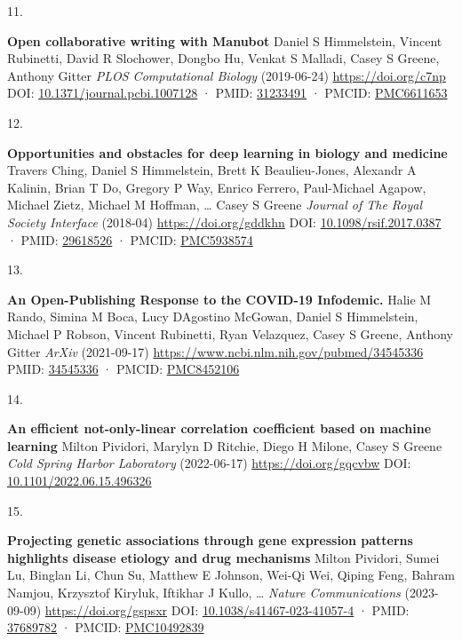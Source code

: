 \documentclass[
]{article}
\newlength{\cslhangindent}
\newlength{\csllabelwidth}
\newlength{\cslentryspacingunit} %
\newenvironment{CSLReferences}[2] %
 {%
  \setlength{\parindent}{0pt}
  \ifodd #1
  \let\oldpar\par
  \def\par{\hangindent=\cslhangindent\oldpar}
  \fi
  \setlength{\parskip}{#2\cslentryspacingunit}
 }%
 {}
\newcommand{\CSLBlock}[1]{#1\hfill\break}
\newcommand{\CSLLeftMargin}[1]{\parbox[t]{\csllabelwidth}{#1}}
\newcommand{\CSLRightInline}[1]{\parbox[t]{\linewidth - \csllabelwidth}{#1}\break}
\begin{document}
\begin{CSLReferences}{0}{0}
\leavevmode{}%
\CSLLeftMargin{11. }%
\CSLRightInline{\textbf{Open collaborative writing with Manubot}
\CSLBlock{Daniel S Himmelstein, Vincent Rubinetti, David R Slochower, Dongbo Hu, Venkat S Malladi, Casey S Greene, Anthony Gitter} \emph{PLOS Computational Biology} (2019-06-24) \url{https://doi.org/c7np}
\CSLBlock{DOI: \href{https://doi.org/10.1371/journal.pcbi.1007128}{10.1371/journal.pcbi.1007128} · PMID: \href{https://www.ncbi.nlm.nih.gov/pubmed/31233491}{31233491} · PMCID: \href{https://www.ncbi.nlm.nih.gov/pmc/articles/PMC6611653}{PMC6611653}}}

\leavevmode{}%
\CSLLeftMargin{12. }%
\CSLRightInline{\textbf{Opportunities and obstacles for deep learning in biology and medicine}
\CSLBlock{Travers Ching, Daniel S Himmelstein, Brett K Beaulieu-Jones, Alexandr A Kalinin, Brian T Do, Gregory P Way, Enrico Ferrero, Paul-Michael Agapow, Michael Zietz, Michael M Hoffman, \ldots{} Casey S Greene} \emph{Journal of The Royal Society Interface} (2018-04) \url{https://doi.org/gddkhn}
\CSLBlock{DOI: \href{https://doi.org/10.1098/rsif.2017.0387}{10.1098/rsif.2017.0387} · PMID: \href{https://www.ncbi.nlm.nih.gov/pubmed/29618526}{29618526} · PMCID: \href{https://www.ncbi.nlm.nih.gov/pmc/articles/PMC5938574}{PMC5938574}}}

\leavevmode{}%
\CSLLeftMargin{13. }%
\CSLRightInline{\textbf{An Open-Publishing Response to the COVID-19 Infodemic.}
\CSLBlock{Halie M Rando, Simina M Boca, Lucy D\textquotesingle Agostino McGowan, Daniel S Himmelstein, Michael P Robson, Vincent Rubinetti, Ryan Velazquez, Casey S Greene, Anthony Gitter} \emph{ArXiv} (2021-09-17) \url{https://www.ncbi.nlm.nih.gov/pubmed/34545336}
\CSLBlock{PMID: \href{https://www.ncbi.nlm.nih.gov/pubmed/34545336}{34545336} · PMCID: \href{https://www.ncbi.nlm.nih.gov/pmc/articles/PMC8452106}{PMC8452106}}}

\leavevmode{}%
\CSLLeftMargin{14. }%
\CSLRightInline{\textbf{An efficient not-only-linear correlation coefficient based on machine learning}
\CSLBlock{Milton Pividori, Marylyn D Ritchie, Diego H Milone, Casey S Greene} \emph{Cold Spring Harbor Laboratory} (2022-06-17) \url{https://doi.org/gqcvbw}
\CSLBlock{DOI: \href{https://doi.org/10.1101/2022.06.15.496326}{10.1101/2022.06.15.496326}}}

\leavevmode{}%
\CSLLeftMargin{15. }%
\CSLRightInline{\textbf{Projecting genetic associations through gene expression patterns highlights disease etiology and drug mechanisms}
\CSLBlock{Milton Pividori, Sumei Lu, Binglan Li, Chun Su, Matthew E Johnson, Wei-Qi Wei, Qiping Feng, Bahram Namjou, Krzysztof Kiryluk, Iftikhar J Kullo, \ldots{} } \emph{Nature Communications} (2023-09-09) \url{https://doi.org/gspsxr}
\CSLBlock{DOI: \href{https://doi.org/10.1038/s41467-023-41057-4}{10.1038/s41467-023-41057-4} · PMID: \href{https://www.ncbi.nlm.nih.gov/pubmed/37689782}{37689782} · PMCID: \href{https://www.ncbi.nlm.nih.gov/pmc/articles/PMC10492839}{PMC10492839}}}


\end{CSLReferences}
\end{document}
